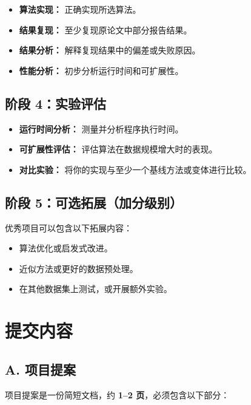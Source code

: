 \documentclass[UTF8, 10pt]{ctexart}
\begin{document}
\begin{itemize}
    \item \textbf{算法实现：} 正确实现所选算法。
    \item \textbf{结果复现：} 至少复现原论文中部分报告结果。
    \item \textbf{结果分析：} 解释复现结果中的偏差或失败原因。
    \item \textbf{性能分析：} 初步分析运行时间和可扩展性。
\end{itemize}

\subsection{阶段 4：实验评估}

\begin{itemize}
    \item \textbf{运行时间分析：} 测量并分析程序执行时间。
    \item \textbf{可扩展性评估：} 评估算法在数据规模增大时的表现。
    \item \textbf{对比实验：} 将你的实现与至少一个基线方法或变体进行比较。
\end{itemize}

\subsection{阶段 5：可选拓展（加分级别）}

优秀项目可以包含以下拓展内容：

\begin{itemize}
    \item 算法优化或启发式改进。
    \item 近似方法或更好的数据预处理。
    \item 在其他数据集上测试，或开展额外实验。
\end{itemize}

\section{提交内容}

\subsection{A. 项目提案}

项目提案是一份简短文档，约 \textbf{1--2 页}，必须包含以下部分：
\end{document}
